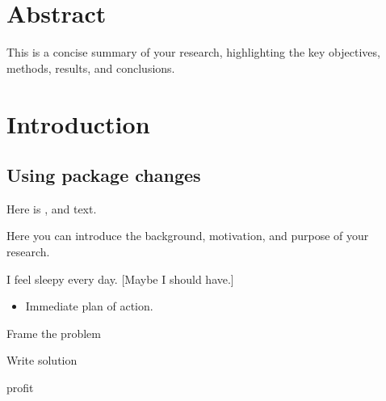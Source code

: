 \documentclass{article}
\begin{document}
\section*{Abstract}

This is a concise summary of your research, highlighting the key objectives, methods, results, and conclusions. 

\section{Introduction}

\subsection{Using package changes}

Here is ,  and  text. 


Here you can introduce the background, motivation, and purpose of your research. 

I feel sleepy every day.  [Maybe I should have.]

\begin{itemize}
  \item Immediate plan of action.
\end{itemize}

\begin{todolist}
  	\item[\done] Frame the problem
  	\item Write solution
  	\item[\wontfix] profit
\end{todolist}

\end{document}
